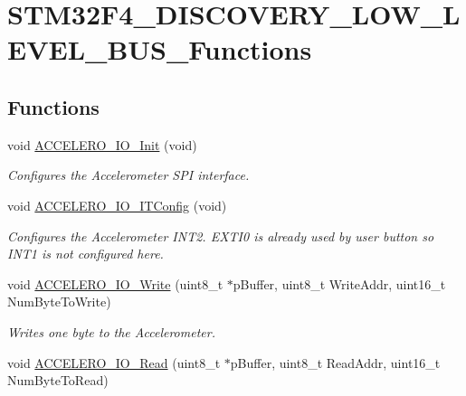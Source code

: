 \hypertarget{group__STM32F4__DISCOVERY__LOW__LEVEL__BUS__Functions}{\section{S\-T\-M32\-F4\-\_\-\-D\-I\-S\-C\-O\-V\-E\-R\-Y\-\_\-\-L\-O\-W\-\_\-\-L\-E\-V\-E\-L\-\_\-\-B\-U\-S\-\_\-\-Functions}
\label{group__STM32F4__DISCOVERY__LOW__LEVEL__BUS__Functions}
}
\subsection*{Functions}
\begin{DoxyCompactItemize}
\item 
void \hyperlink{group__STM32F4__DISCOVERY__LOW__LEVEL__BUS__Functions_gaeb312e0ba50244c3008de6441167f181}{A\-C\-C\-E\-L\-E\-R\-O\-\_\-\-I\-O\-\_\-\-Init} (void)
\begin{DoxyCompactList}\small\item\em Configures the Accelerometer S\-P\-I interface. \end{DoxyCompactList}\item 
void \hyperlink{group__STM32F4__DISCOVERY__LOW__LEVEL__BUS__Functions_gacb0cf2419ee11c6c47c694e80f1e217b}{A\-C\-C\-E\-L\-E\-R\-O\-\_\-\-I\-O\-\_\-\-I\-T\-Config} (void)
\begin{DoxyCompactList}\small\item\em Configures the Accelerometer I\-N\-T2. E\-X\-T\-I0 is already used by user button so I\-N\-T1 is not configured here. \end{DoxyCompactList}\item 
void \hyperlink{group__STM32F4__DISCOVERY__LOW__LEVEL__BUS__Functions_gaeedea8061d4abde8cd304b454334ae42}{A\-C\-C\-E\-L\-E\-R\-O\-\_\-\-I\-O\-\_\-\-Write} (uint8\-\_\-t $\ast$p\-Buffer, uint8\-\_\-t Write\-Addr, uint16\-\_\-t Num\-Byte\-To\-Write)
\begin{DoxyCompactList}\small\item\em Writes one byte to the Accelerometer. \end{DoxyCompactList}\item 
void \hyperlink{group__STM32F4__DISCOVERY__LOW__LEVEL__BUS__Functions_ga78371d00a01f2a0cdd613306e4c4e58f}{A\-C\-C\-E\-L\-E\-R\-O\-\_\-\-I\-O\-\_\-\-Read} (uint8\-\_\-t $\ast$p\-Buffer, uint8\-\_\-t Read\-Addr, uint16\-\_\-t Num\-Byte\-To\-Read)

\end{DoxyCompactItemize}
